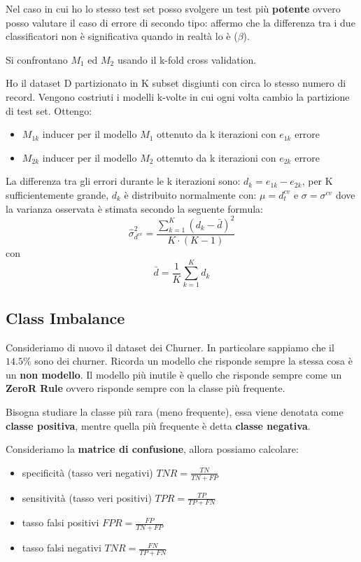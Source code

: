 Nel caso in cui ho lo stesso test set posso svolgere un test pi\`u \textbf{potente} ovvero posso valutare il caso di errore di secondo tipo: affermo che la differenza tra i due classificatori non \`e significativa quando in realt\`a lo \`e ($\beta$). 

Si confrontano $M_1$ ed $M_2$ usando il k-fold cross validation.

Ho il dataset D partizionato in K subset disgiunti con circa lo stesso numero di record. Vengono costriuti i modelli k-volte in cui ogni volta cambio la partizione di test set. Ottengo:
\begin{itemize}
	\item $M_{1k}$ inducer per il modello $M_1$ ottenuto da k iterazioni con $e_{1k}$ errore
	\item $M_{2k}$ inducer per il modello $M_2$ ottenuto da k iterazioni con $e_{2k}$ errore
\end{itemize}

La differenza tra gli errori durante le k iterazioni sono: $d_k = e_{1k} - e_{2k}$, per K sufficientemente grande, $d_k$ \`e distribuito normalmente con: $\mu = d_t^{cv}$ e $\sigma = \sigma^{cv}$ dove la varianza osservata \`e stimata secondo la seguente formula: \[ \hat{\sigma}^2_{d^{cv}} = \frac{\sum_{k=1}^{K}(d_k - \bar{d})^2}{K \cdot (K-1)} \] con \[ \bar{d} = \frac{1}{K} \sum_{k=1}^K d_k \]

\subsection{Class Imbalance}
Consideriamo di nuovo il dataset dei Churner. In particolare sappiamo che il $14.5\%$ sono dei churner. Ricorda un modello che risponde sempre la stessa cosa \`e un \textbf{non modello}. Il modello pi\`u inutile \`e quello che risponde sempre come un \textbf{ZeroR Rule} ovvero risponde sempre con la classe pi\`u frequente.

Bisogna studiare la classe pi\`u rara (meno frequente), essa viene denotata come \textbf{classe positiva}, mentre quella pi\`u frequente \`e detta \textbf{classe negativa}.

Consideriamo la \textbf{matrice di confusione}, allora possiamo calcolare:
\begin{itemize}
	\item specificit\`a (tasso veri negativi) $TNR = \frac{TN}{TN + FP}$
	\item sensitivit\`a (tasso veri positivi) $TPR = \frac{TP}{TP + FN}$
	\item tasso falsi positivi $FPR = \frac{FP}{TN + FP}$
	\item tasso falsi negativi $TNR = \frac{FN}{TP + FN}$
\end{itemize}

